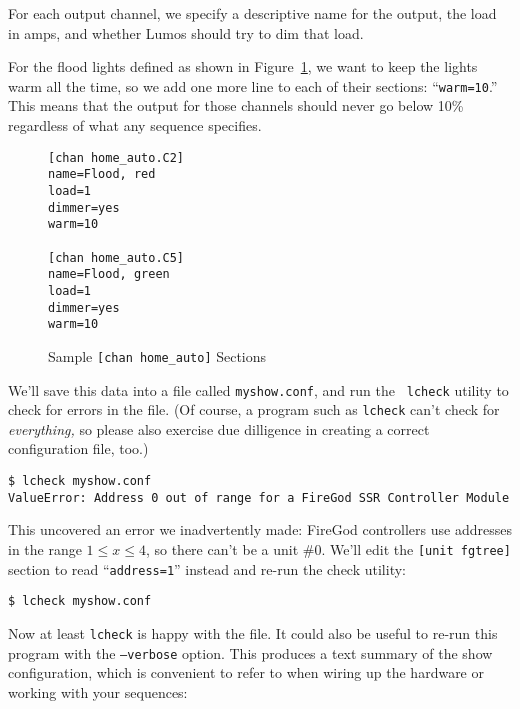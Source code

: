\documentclass{article}
\begin{document}
For each output channel, we specify a descriptive name for the output, the 
load in amps, and whether Lumos should try to dim that load.

For the flood lights defined as shown in Figure~\ref{conf:homeauto}, we want
to keep the lights warm all the time, so we add one more line to each of their
sections: ``{\tt warm=10}.''  This means that the output for those channels
should never go below 10\% regardless of what any sequence specifies.

\begin{figure}[htbp]
\begin{verbatim}
[chan home_auto.C2]
name=Flood, red
load=1
dimmer=yes
warm=10

[chan home_auto.C5]
name=Flood, green
load=1
dimmer=yes
warm=10
\end{verbatim}
\caption{Sample {\tt[chan home\_auto]} Sections}
\label{conf:homeauto}
\end{figure}

We'll save this data into a file called {\tt myshow.conf}, and run the {\tt
lcheck} utility to check for errors in the file.  (Of course, a program such
as {\tt lcheck} can't check for {\em everything,\/} so please also exercise
due dilligence in creating a correct configuration file, too.)

\begin{verbatim}
$ lcheck myshow.conf
ValueError: Address 0 out of range for a FireGod SSR Controller Module
\end{verbatim}

This uncovered an error we inadvertently made:  FireGod controllers use
addresses in the range $1\le x\le4$, so there can't be a unit \#0.
We'll edit the {\tt[unit~fgtree]} section to read ``{\tt address=1}''
instead and re-run the check utility:

\begin{verbatim}
$ lcheck myshow.conf
\end{verbatim}

Now at least {\tt lcheck} is happy with the file.  It could also be useful to
re-run this program with the {\tt --verbose} option.  This produces a text 
summary of the show configuration, which is convenient to refer to when wiring
up the hardware or working with your sequences:
\end{document}
